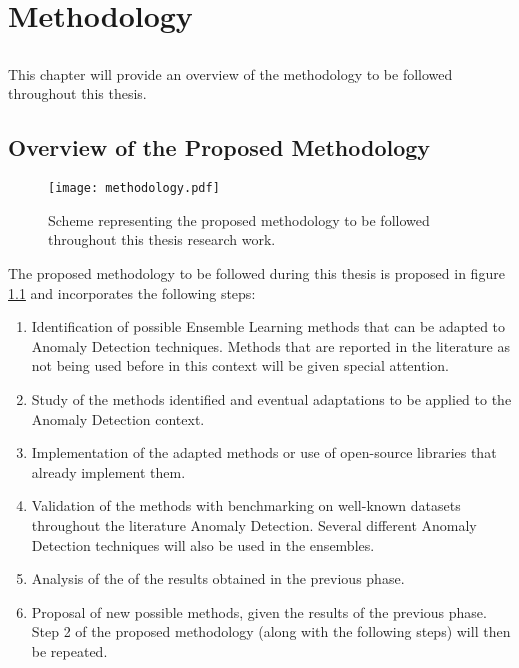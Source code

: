 \chapter{Methodology} \label{chap:metho}

\section*{}

This chapter will provide an overview of the methodology to be followed throughout this thesis.

\section{Overview of the Proposed Methodology}

\begin{figure}[!ht]
	\centering
	\texttt{[image: methodology.pdf]}
	\caption{Scheme representing the proposed methodology to be followed throughout this thesis research work.}
	\label{fig:methodology}
\end{figure}

The proposed methodology to be followed during this thesis is proposed in figure \ref{fig:methodology} and incorporates the following steps:

\begin{enumerate}
	\item Identification of possible Ensemble Learning methods that can be adapted to Anomaly Detection techniques. Methods that are reported in the literature as not being used before in this context will be given special attention.
	
	\item Study of the methods identified and eventual adaptations to be applied to the Anomaly Detection context.
	
	\item Implementation of the adapted methods or use of open-source libraries that already implement them.
	
	\item Validation of the methods with benchmarking on well-known datasets throughout the literature Anomaly Detection. Several different Anomaly Detection techniques will also be used in the ensembles.
	
	\item Analysis of the of the results obtained in the previous phase.
	
	\item Proposal of new possible methods, given the results of the previous phase. Step 2 of the proposed methodology (along with the following steps) will then be repeated.
\end{enumerate}

